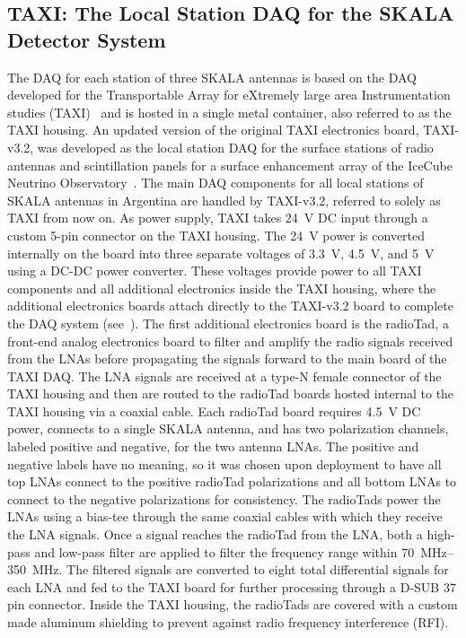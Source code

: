 \subsection{TAXI: The Local Station DAQ for the SKALA Detector System}\label{ssec:taxi_daq}

The DAQ for each station of three SKALA antennas is based on the DAQ developed for the Transportable Array for eXtremely large area Instrumentation studies (TAXI)~\cite{arena2014_taxi} and is hosted in a single metal container, also referred to as the TAXI housing.
An updated version of the original TAXI electronics board, TAXI-v3.2, was developed as the local station DAQ for the surface stations of radio antennas and scintillation panels for a surface enhancement array of the IceCube Neutrino Observatory~\cite{haungs_epj2019_sae}.
The main DAQ components for all local stations of SKALA antennas in Argentina are handled by TAXI-v3.2, referred to solely as TAXI from now on.
As power supply, TAXI takes \qty{24}{\volt} DC input through a custom 5-pin connector on the TAXI housing.
The \qty{24}{\volt} power is converted internally on the board into three separate voltages of \SI{3.3}{\volt}, \SI{4.5}{\volt}, and \SI{5}{\volt} using a DC-DC power converter. 
These voltages provide power to all TAXI components and all additional electronics inside the TAXI housing, where the additional electronics boards attach directly to the TAXI-v3.2 board to complete the DAQ system (see~).
The first additional electronics board is the radioTad, a front-end analog electronics board to filter and amplify the radio signals received from the LNAs before propagating the signals forward to the main board of the TAXI DAQ.
The LNA signals are received at a type-N female connector of the TAXI housing and then are routed to the radioTad boards hosted internal to the TAXI housing via a coaxial cable.
Each radioTad board requires \SI{4.5}{\volt} DC power, connects to a single SKALA antenna, and has two polarization channels, labeled positive and negative, for the two antenna LNAs.
The positive and negative labels have no meaning, so it was chosen upon deployment to have all top LNAs connect to the positive radioTad polarizations and all bottom LNAs to connect to the negative polarizations for consistency.
The radioTads power the LNAs using a bias-tee through the same coaxial cables with which they receive the LNA signals.
Once a signal reaches the radioTad from the LNA, both a high-pass and low-pass filter are applied to filter the frequency range within \SIrange{70}{350}{\mega\hertz}.
The filtered signals are converted to eight total differential signals for each LNA and fed to the TAXI board for further processing through a D-SUB 37 pin connector.
Inside the TAXI housing, the radioTads are covered with a custom made aluminum shielding to prevent against radio frequency interference (RFI).

